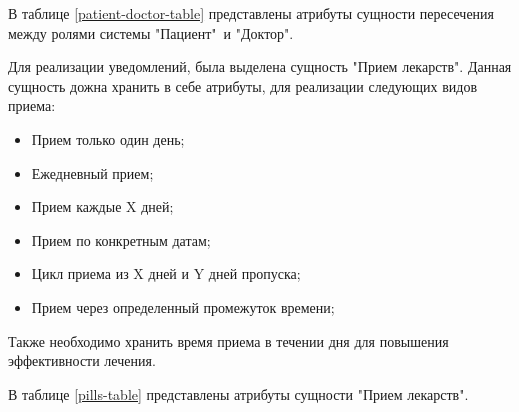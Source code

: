     В таблице \ref{patient-doctor-table} представлены атрибуты сущности пересечения между %
    ролями системы "Пациент"\ и "Доктор".
    \newline
    \begin{table}[H]
        \caption{Описание атрибутов сущности пересечения ролей  "Пациент"\ и "Доктор".}
        \label{patient-doctor-table}
    \end{table}

    Для реализации уведомлений, была выделена сущность "Прием лекарств". %
    Данная сущность дожна хранить в себе атрибуты, для реализации следующих видов приема:
    
    \begin{itemize}
        \item Прием только один день;
        \item Ежедневный прием;
        \item Прием каждые X дней;
        \item Прием по конкретным датам;
        \item Цикл приема из X дней и Y дней пропуска; 
        \item Прием через определенный промежуток времени;
    \end{itemize}

    Также необходимо хранить время приема в течении дня для повышения %
    эффективности лечения.

    В таблице \ref{pills-table} представлены атрибуты сущности "Прием лекарств".
    \newline

